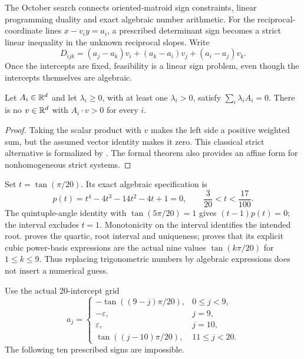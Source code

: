 The October search connects oriented-matroid sign constraints, linear
programming duality and exact algebraic number arithmetic. For the
reciprocal-coordinate lines $x-v_i y=a_i$, a prescribed determinant
sign becomes a strict linear inequality in the unknown reciprocal
slopes. Write
\begin{equation}
 D_{ijk}=(a_j-a_k)v_i+(a_k-a_i)v_j+(a_i-a_j)v_k.
 \label{exp:linear-determinant}
\end{equation}
Once the intercepts are fixed, feasibility is a linear sign problem,
even though the intercepts themselves are algebraic.

\begin{lemma}\label{exp:farkas}
Let $A_i\in\mathbb{R}^d$ and let $\lambda_i\ge0$, with at least one
$\lambda_i>0$, satisfy $\sum_i\lambda_i A_i=0$. There is no $v\in\mathbb{R}^d$
with $A_i\mathbin{\cdot}v>0$ for every $i$.
\end{lemma}
\begin{proof}
Taking the scalar product with $v$ makes the left side a positive
weighted sum, but the assumed vector identity makes it zero. This
classical strict alternative is formalized by
.
The formal theorem also provides an affine form for nonhomogeneous
strict systems.
\end{proof}

Set $t=\tan(\pi/20)$. Its exact algebraic specification is
\begin{equation}
 p(t)=t^4-4t^3-14t^2-4t+1=0,
 \qquad \frac3{20}<t<\frac{17}{100}.
 \label{exp:quartic}
\end{equation}
The quintuple-angle identity with $\tan(5\pi/20)=1$ gives
$(t-1)p(t)=0$; the interval excludes $t=1$. Monotonicity on the interval
identifies the intended root.  proves the
quartic, root interval and uniqueness;  proves
that its explicit cubic power-basis expressions are the actual nine
values $\tan(k\pi/20)$ for $1\le k\le9$. Thus replacing trigonometric
numbers by algebraic expressions does not insert a numerical guess.

Use the actual 20-intercept grid
\[
 a_j=\begin{cases}
 -\tan((9-j)\pi/20),&0\le j<9,\\
 -\varepsilon,&j=9,\\
 \varepsilon,&j=10,\\
 \tan((j-10)\pi/20),&11\le j<20.
 \end{cases}
\]
The following ten prescribed signs are impossible.


